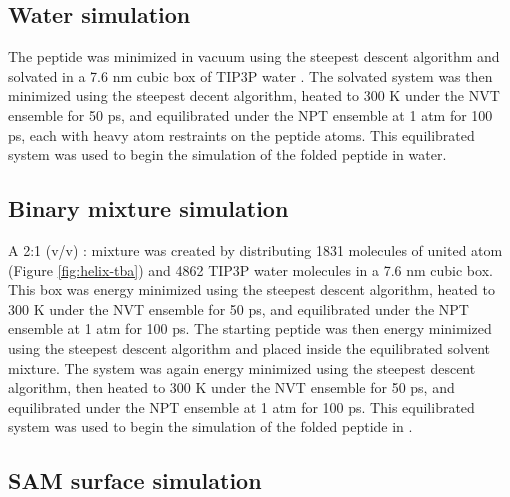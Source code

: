 \subsection{Water simulation}

The peptide was minimized in vacuum using the steepest descent algorithm and solvated in a 7.6 nm cubic box of TIP3P water \cite{Jorgensen1983}. 
The solvated system was then minimized using the steepest decent algorithm, heated to 300 K under the NVT ensemble for 50 ps, and equilibrated under the NPT ensemble at 1 atm for 100 ps, each with heavy atom restraints on the peptide atoms. 
This equilibrated system was used to begin the simulation of the folded peptide in water. 

\subsection{Binary mixture simulation}

A 2:1 (v/v) \tba{}: mixture was created by distributing 1831 molecules of united atom \tba{} (Figure \ref{fig:helix-tba}) and 4862 TIP3P water molecules in a 7.6 nm cubic box. 
This box was energy minimized using the steepest descent algorithm, heated to 300 K under the NVT ensemble for 50 ps, and equilibrated under the NPT ensemble at 1 atm for 100 ps. 
The starting peptide was then energy minimized using the steepest descent algorithm and placed inside the equilibrated solvent mixture. 
The system was again energy minimized using the steepest descent algorithm, then heated to 300 K under the NVT ensemble for 50 ps, and equilibrated under the NPT ensemble at 1 atm for 100 ps. 
This equilibrated system was used to begin the simulation of the folded peptide in \tbawat{}. 

\subsection{SAM surface simulation}

